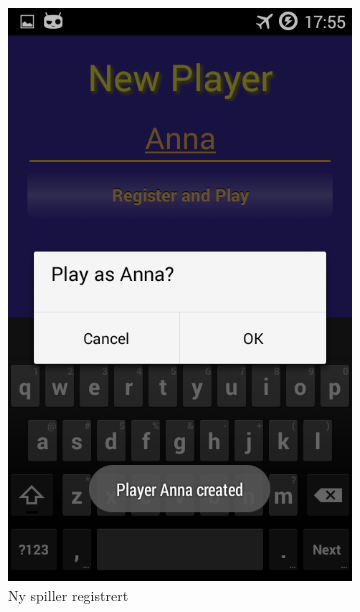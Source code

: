 \begin{figure}[ht]
\begin{subfigure}[b]{0.25\textwidth}
        \includegraphics[width=\textwidth]{./img/bruksanvisning/3.png}
        \caption{Ny spiller registrert}
        \label{fig:ny_spiller}
    \end{subfigure}
    \begin{subfigure}[b]{0.25\textwidth}

\end{subfigure}
\end{figure}

